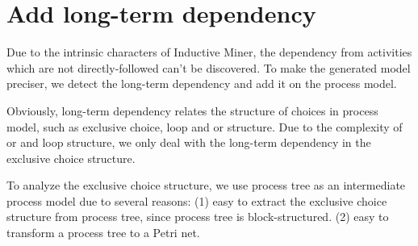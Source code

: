 \section{Add long-term dependency}
Due to the intrinsic characters of Inductive Miner, the dependency from activities which are not directly-followed can't be discovered. 
To make the generated model preciser, we detect the long-term dependency and add it on the process model. 

Obviously, long-term dependency relates the structure of choices in process model, such as exclusive choice, loop and or structure. Due to the complexity of or and loop structure, we only deal with the long-term dependency in the exclusive choice structure. 

To analyze the exclusive choice structure, we use process tree as an intermediate process model due to several reasons: (1) easy to extract the exclusive choice structure from process tree, since process tree is block-structured. (2) easy to transform a process tree to a Petri net. 

